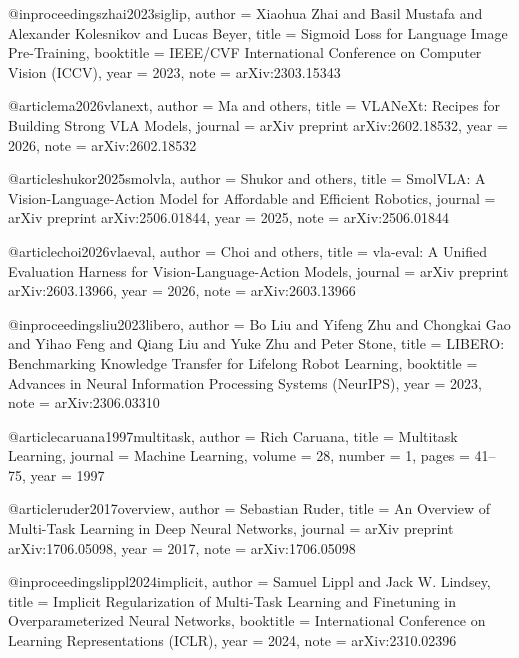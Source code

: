 @inproceedings{zhai2023siglip,
  author    = {Xiaohua Zhai and Basil Mustafa and Alexander Kolesnikov and Lucas Beyer},
  title     = {Sigmoid Loss for Language Image Pre-Training},
  booktitle = {IEEE/CVF International Conference on Computer Vision (ICCV)},
  year      = {2023},
  note      = {arXiv:2303.15343}
}

@article{ma2026vlanext,
  author    = {Ma and others},
  title     = {{VLANeXt}: Recipes for Building Strong {VLA} Models},
  journal   = {arXiv preprint arXiv:2602.18532},
  year      = {2026},
  note      = {arXiv:2602.18532}
}

@article{shukor2025smolvla,
  author    = {Shukor and others},
  title     = {{SmolVLA}: A Vision-Language-Action Model for Affordable and Efficient Robotics},
  journal   = {arXiv preprint arXiv:2506.01844},
  year      = {2025},
  note      = {arXiv:2506.01844}
}

@article{choi2026vlaeval,
  author    = {Choi and others},
  title     = {vla-eval: A Unified Evaluation Harness for Vision-Language-Action Models},
  journal   = {arXiv preprint arXiv:2603.13966},
  year      = {2026},
  note      = {arXiv:2603.13966}
}


@inproceedings{liu2023libero,
  author    = {Bo Liu and Yifeng Zhu and Chongkai Gao and Yihao Feng and Qiang Liu and Yuke Zhu and Peter Stone},
  title     = {{LIBERO}: Benchmarking Knowledge Transfer for Lifelong Robot Learning},
  booktitle = {Advances in Neural Information Processing Systems (NeurIPS)},
  year      = {2023},
  note      = {arXiv:2306.03310}
}


@article{caruana1997multitask,
  author    = {Rich Caruana},
  title     = {Multitask Learning},
  journal   = {Machine Learning},
  volume    = {28},
  number    = {1},
  pages     = {41--75},
  year      = {1997}
}

@article{ruder2017overview,
  author    = {Sebastian Ruder},
  title     = {An Overview of Multi-Task Learning in Deep Neural Networks},
  journal   = {arXiv preprint arXiv:1706.05098},
  year      = {2017},
  note      = {arXiv:1706.05098}
}

@inproceedings{lippl2024implicit,
  author    = {Samuel Lippl and Jack W. Lindsey},
  title     = {Implicit Regularization of Multi-Task Learning and Finetuning in Overparameterized Neural Networks},
  booktitle = {International Conference on Learning Representations (ICLR)},
  year      = {2024},
  note      = {arXiv:2310.02396}
}

